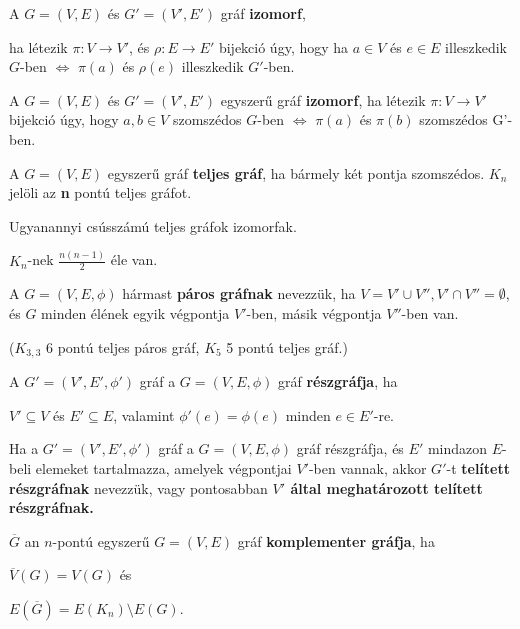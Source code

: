 \documentclass[10pt]{article}
\renewcommand{\\}{\par\noindent}
\begin{document}
\begin{frame}

\begin{tcolorbox}[title={Def.: Gráfok izomorfiája}]
A $G = (V, E)$ és $G' = (V', E')$ gráf \textbf{izomorf},\\
ha létezik ${\pi} : V \rightarrow V'$, és $\rho : E \rightarrow E'$ bijekció úgy, hogy ha $a \in V$ és $e \in E$ illeszkedik $G$-ben $\iff$ ${\pi}(a)$ és ${\rho}(e)$ illeszkedik $G'$-ben.\\
\bigskip
A $G = (V, E)$ és $G' = (V', E')$ egyszerű gráf \textbf{izomorf}, ha létezik ${\pi} : V \rightarrow V'$ bijekció úgy, hogy $a, b \in V$ szomszédos $G$-ben $\iff$ ${\pi}(a)$ és ${\pi}(b)$ szomszédos G'-ben.\\
\bigskip
A $G = (V, E)$ egyszerű gráf \textbf{teljes gráf}, ha bármely két pontja szomszédos. \textbf{$K_n$} jelöli az \textbf{n} pontú teljes gráfot.
\end{tcolorbox}

\begin{tcolorbox}[title={Ész}]
Ugyanannyi csússzámú teljes gráfok izomorfak.\\
\bigskip
$K_n$-nek $\frac{n(n - 1)}{2}$ éle van.
\end{tcolorbox}
\end{frame}

\begin{frame}

\begin{tcolorbox}[title={Def.: Páros Gráf}]
A $G = (V, E, {\phi})$ hármast \textbf{páros gráfnak} nevezzük, ha $V = V' \cup V'', V' \cap V'' = \emptyset$, és $G$ minden élének egyik végpontja $V'$-ben, másik végpontja $V''$-ben van.\\
\medskip
($K_{3, 3}$ 6 pontú teljes páros gráf, $K_5$ 5 pontú teljes gráf.)
\end{tcolorbox}
\begin{tcolorbox}[title={Def.: Részgráf}]
A $G' = (V', E', {\phi}')$ gráf a $G = (V, E, {\phi})$ gráf \textbf{részgráfja}, ha\\
$V' \subseteq V$ és $E' \subseteq E$, valamint ${\phi}'(e) = {\phi}(e)$ minden $e \in E'$-re.
\end{tcolorbox}
\begin{tcolorbox}[title={Def.: Telített Részgráf}]
Ha a $G' = (V', E', {\phi}')$ gráf a $G = (V, E, {\phi})$ gráf részgráfja, és $E'$ mindazon $E$-beli elemeket tartalmazza, amelyek végpontjai $V'$-ben vannak, akkor $G'$-t \textbf{telített részgráfnak} nevezzük, vagy pontosabban \textbf{$V'$ által meghatározott telített részgráfnak.}
\end{tcolorbox}
\begin{tcolorbox}[title={Komplementer Gráf}]
$\overline{G}$ an $n$-pontú egyszerű $G = (V, E)$ gráf \textbf{komplementer gráfja}, ha\\
\smallskip
$\overline{V}(G) = V(G)$ és\\
$E(\overline{G}) = E(K_n) \setminus E(G)$.
\end{tcolorbox}

\end{frame}
\end{document}
